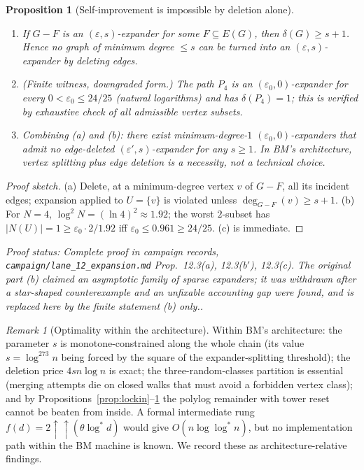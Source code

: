 \documentclass[a4paper,11pt]{amsart}
\newtheorem{proposition}[theorem]{Proposition}
\theoremstyle{definition}
\theoremstyle{remark}
\newtheorem{remark}[theorem]{Remark}
\newcommand{\proofsrc}[1]{\par\smallskip\noindent\begin{sloppypar}\small\emph{Proof status: #1.}\end{sloppypar}\par\smallskip}
\begin{document}
\begin{proposition}[Self-improvement is impossible by deletion alone]\label{prop:selfrobust}
\begin{enumerate}
\item[(a)] If $G-F$ is an $(\varepsilon,s)$-expander for some $F\subseteq E(G)$, then $\delta(G)\ge s+1$.
Hence no graph of minimum degree $\le s$ can be turned into an $(\varepsilon,s)$-expander by deleting
edges.
\item[(b)] \emph{(Finite witness, downgraded form.)} The path $P_4$ is an $(\varepsilon_0,0)$-expander for
every $0<\varepsilon_0\le 24/25$ (natural logarithms) and has $\delta(P_4)=1$; this is verified by
exhaustive check of all admissible vertex subsets.
\item[(c)] Combining (a) and (b): there exist minimum-degree-$1$ $(\varepsilon_0,0)$-expanders that admit
no edge-deleted $(\varepsilon',s)$-expander for any $s\ge1$. In BM's architecture, vertex splitting plus
edge deletion is a necessity, not a technical choice.
\end{enumerate}
\end{proposition}
\begin{proof}[Proof sketch]
(a) Delete, at a minimum-degree vertex $v$ of $G-F$, all its incident edges; expansion applied to
$U=\{v\}$ is violated unless $\deg_{G-F}(v)\ge s+1$. (b) For $N=4$, $\log^2N=(\ln4)^2\approx1.92$; the
worst $2$-subset has $|N(U)|=1\ge\varepsilon_0\cdot2/1.92$ iff $\varepsilon_0\le0.961\ge24/25$. (c) is
immediate.
\end{proof}
\proofsrc{Complete proof in campaign records, \texttt{campaign/lane\_12\_expansion.md} Prop.~12.3(a),
12.3(b$'$), 12.3(c). The original part (b) claimed an asymptotic family of sparse expanders; it was
withdrawn after a star-shaped counterexample and an unfixable accounting gap were found, and is replaced
here by the finite statement (b) only.}

\begin{remark}[Optimality within the architecture]\label{rem:bmopt}
Within BM's architecture: the parameter $s$ is monotone-constrained along the whole chain (its value
$s=\log^{273}n$ being forced by the square of the expander-splitting threshold); the deletion price
$4sn\log n$ is exact; the three-random-classes partition is essential (merging attempts die on closed walks
that must avoid a forbidden vertex class); and by
Propositions~\ref{prop:lockin}--\ref{prop:selfrobust} the polylog remainder with tower reset cannot be
beaten from inside. A formal intermediate rung $f(d)=2\uparrow\uparrow(\theta\log^*d)$ would give
$O(n\log\log^* n)$, but no implementation path within the BM machine is known. We record these as
architecture-relative findings.
\end{remark}
\end{document}
